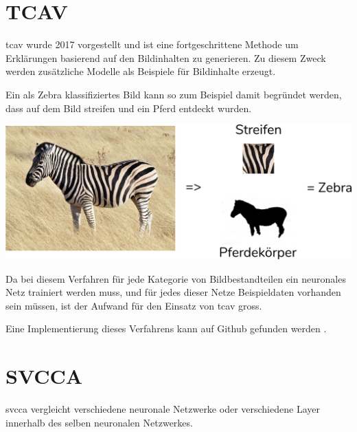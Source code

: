 \documentclass[
  12pt, %
  a4paper, %
  oneside, %
  openany, 
  numbers=noenddot, %
  BCOR=5mm, %
  parskip=half*, %
  thesis, %
]{bfhbook}
\begin{document}
\section{TCAV}
 \Gls{tcav} wurde 2017 vorgestellt \parencite{Kim2017} und ist eine fortgeschrittene Methode um Erklärungen basierend auf den Bildinhalten zu generieren. Zu diesem Zweck werden zusätzliche Modelle als Beispiele für Bildinhalte erzeugt.
 
 Ein als Zebra klassifiziertes Bild kann so zum Beispiel damit begründet werden, dass auf dem Bild streifen und ein Pferd entdeckt wurden.
\begin{center}
\begin{minipage}[t]{\linewidth}
\includegraphics[width=\textwidth]{Bilder/Zebra-Explanation.PNG}
\end{minipage}
\end{center}
Da bei diesem Verfahren für jede Kategorie von Bildbestandteilen ein neuronales Netz trainiert werden muss, und für jedes dieser Netze Beispieldaten vorhanden sein müssen, ist der Aufwand für den Einsatz von \Gls{tcav} gross. 

Eine Implementierung dieses Verfahrens kann auf Github gefunden werden \cite{tcavLink}.

\section{SVCCA}
\acrlong{svcca} \parencite{Raghu2017} vergleicht verschiedene neuronale Netzwerke oder verschiedene Layer innerhalb des selben neuronalen Netzwerkes.
\end{document}
